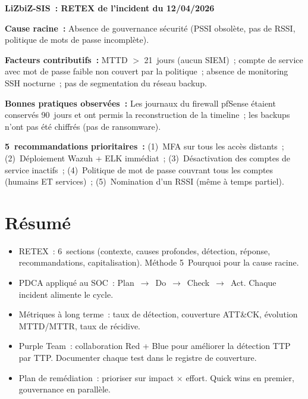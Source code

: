 \begin{boxlizbiz}
\textbf{LiZbiZ-SIS~: RETEX de l'incident du 12/04/2026}

\textbf{Cause racine~:} Absence de gouvernance sécurité (PSSI obsolète,
pas de RSSI, politique de mots de passe incomplète).

\textbf{Facteurs contributifs~:} MTTD $>$ 21~jours (aucun SIEM)~;
compte de service avec mot de passe faible non couvert par la politique~;
absence de monitoring SSH nocturne~; pas de segmentation du réseau backup.

\textbf{Bonnes pratiques observées~:} Les journaux du firewall pfSense
étaient conservés 90~jours et ont permis la reconstruction de la
timeline~; les backups n'ont pas été chiffrés (pas de ransomware).

\textbf{5~recommandations prioritaires~:} (1)~MFA sur tous les accès
distants~; (2)~Déploiement Wazuh + ELK immédiat~; (3)~Désactivation
des comptes de service inactifs~; (4)~Politique de mot de passe
couvrant tous les comptes (humains ET services)~;
(5)~Nomination d'un RSSI (même à temps partiel).
\end{boxlizbiz}

\section*{Résumé}

\begin{boxresume}
\begin{itemize}
  \item RETEX~: 6~sections (contexte, causes profondes, détection,
        réponse, recommandations, capitalisation). Méthode 5~Pourquoi
        pour la cause racine.
  \item PDCA appliqué au SOC~: Plan~$\to$~Do~$\to$~Check~$\to$~Act.
        Chaque incident alimente le cycle.
  \item Métriques à long terme~: taux de détection, couverture ATT\&CK,
        évolution MTTD/MTTR, taux de récidive.
  \item Purple Team~: collaboration Red + Blue pour améliorer la détection
        TTP par TTP. Documenter chaque test dans le registre de couverture.
  \item Plan de remédiation~: prioriser sur impact $\times$ effort.
        Quick wins en premier, gouvernance en parallèle.
\end{itemize}
\end{boxresume}

